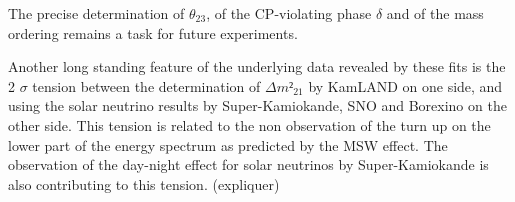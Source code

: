 The precise determination of $\theta_{23}$, of the CP-violating phase $\delta$ and of the mass ordering remains a task for future experiments.

Another long standing feature of the underlying data revealed by these fits is the 2 $\sigma$ tension between the determination of $\Delta m²_{21}$ by KamLAND on one side, and using the solar neutrino results by Super-Kamiokande, SNO and Borexino on the other side.
This tension is related to the non observation of the turn up on the lower part of the energy spectrum as predicted by the MSW effect. The observation of the day-night effect for solar neutrinos by Super-Kamiokande is also contributing to this tension. (expliquer)  

